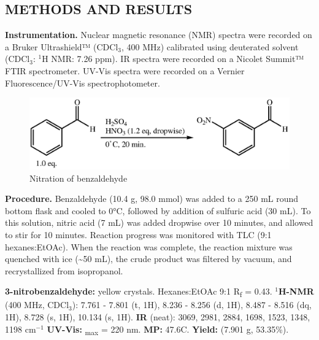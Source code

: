 \documentclass[12pt]{article}
\let\bf\textbf
\begin{document}
\subsection*{METHODS AND RESULTS}
\bf{Instrumentation.} Nuclear magnetic resonance (NMR) spectra were recorded on a Bruker Ultrashield™ (CDCl$_3$, 400 MHz) calibrated using deuterated solvent (CDCl$_3$: $^1$H NMR: 7.26 ppm). IR spectra were recorded on a Nicolet Summit™ FTIR spectrometer. UV-Vis spectra were recorded on a Vernier Fluorescence/UV-Vis spectrophotometer.

\begin{figure}[H]
    \centering
    \includegraphics[scale=0.8]{schemes/nitration.eps}
    \caption{Nitration of benzaldehyde}
\end{figure}
\bf{Procedure.} Benzaldehyde (10.4 g, 98.0 mmol) was added to a 250 mL round bottom flask and cooled to 0°C, followed by addition of sulfuric acid (30 mL). To this solution, nitric acid (7 mL) was added dropwise over 10 minutes, and allowed to stir for 10 minutes. Reaction progress was monitored with TLC (9:1 hexanes:EtOAc). When the reaction was complete, the reaction mixture was quenched with ice (\textasciitilde 50 mL), the crude product was filtered by vacuum, and recrystallized from isopropanol.

\noindent\bf{3-nitrobenzaldehyde:} yellow crystals. Hexanes:EtOAc 9:1 R\textsubscript{f} = 0.43. \bf{$^1$H-NMR} (400 MHz, CDCl$_3$): \textdelta\hspace{0mm} 7.761 - 7.801 (t, 1H), 8.236 - 8.256 (d, 1H), 8.487 - 8.516 (dq, 1H), 8.728 (s, 1H), 10.134 (s, 1H). \bf{IR} (neat): 3069, 2981, 2884, 1698, 1523, 1348, 1198 cm$^{-1}$ \bf{UV-Vis:} \textlambda\textsubscript{max} = 220 nm. \bf{MP:} 47.6\degree C. \bf{Yield:} (7.901 g, 53.35\%).
\end{document}
